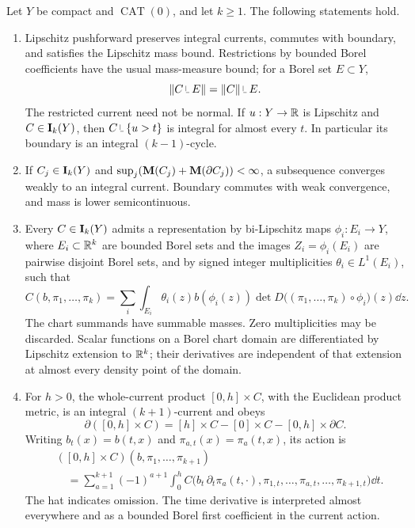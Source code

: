 \begin{theorem}
\label{thm:current-background}
Let \(Y\) be compact and \(\operatorname{CAT}(0)\), and let \(k\ge1\).
The following statements hold.
\begin{enumerate}[label=\textup{(\roman*)}]
\item Lipschitz pushforward preserves integral currents, commutes with
boundary, and satisfies the Lipschitz mass bound. Restrictions by bounded
Borel coefficients have the usual mass-measure bound; for a Borel set
\(E\subset Y\),
\[
 \|C\restr E\|=\|C\|\restr E.
\]
The restricted current need not be normal. If \(u:Y\to\mathbb R\)
is Lipschitz and \(C\in\mathbf I_k(Y)\), then
\(C\restr\{u>t\}\) is integral for almost every \(t\).
In particular its boundary is an integral \((k-1)\)-cycle.

\item If \(C_j\in\mathbf I_k(Y)\) and
\(\sup_j(\mathbf M(C_j)+\mathbf M(\partial C_j))<\infty\), a subsequence converges
weakly to an integral current. Boundary commutes with weak convergence,
and mass is lower semicontinuous.

\item Every \(C\in\mathbf I_k(Y)\) admits a representation by bi-Lipschitz
maps \(\phi_i:E_i\to Y\), where \(E_i\subset\mathbb R^k\) are bounded Borel
sets and the images \(Z_i=\phi_i(E_i)\) are pairwise disjoint Borel sets,
and by signed integer multiplicities \(\theta_i\in L^1(E_i)\), such that
\begin{equation}
\label{eq:chart-action}
 C(b,\pi_1,\ldots,\pi_k)
 =\sum_i\int_{E_i}\theta_i(z)b(\phi_i(z))
       \det D\bigl((\pi_1,\ldots,\pi_k)\circ\phi_i\bigr)(z)\dd z.
\end{equation}
The chart summands have summable masses. Zero multiplicities may be
discarded. Scalar functions on a Borel chart domain are differentiated
by Lipschitz extension to \(\mathbb R^k\); their derivatives are independent
of that extension at almost every density point of the domain.

\item For \(h>0\), the whole-current product \([0,h]\times C\), with
the Euclidean product metric, is an integral \((k+1)\)-current and obeys
\begin{equation}
\label{eq:interval-product-boundary}
 \partial([0,h]\times C)
 =[h]\times C-[0]\times C-[0,h]\times\partial C.
\end{equation}
Writing \(b_t(x)=b(t,x)\) and \(\pi_{a,t}(x)=\pi_a(t,x)\), its action is
\begin{equation}
\label{eq:interval-product-action}
\begin{split}
 &([0,h]\times C)(b,\pi_1,\ldots,\pi_{k+1})\\
 &\quad=\sum_{a=1}^{k+1}(-1)^{a+1}\int_0^h
 C\bigl(b_t\,\partial_t\pi_a(t,\cdot),
          \pi_{1,t},\ldots,\widehat{\pi_{a,t}},\ldots,
          \pi_{k+1,t}\bigr)\dd t.
\end{split}
\end{equation}
The hat indicates omission. The time derivative is interpreted almost
everywhere and as a bounded Borel first coefficient in the current action.


\end{enumerate}
\end{theorem}
